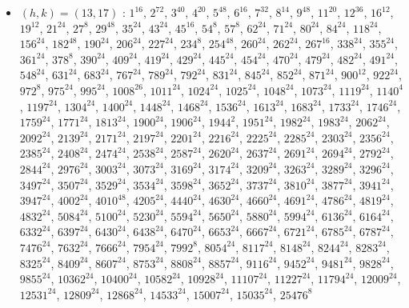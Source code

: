 \begin{itemize}
\item $(h,k)=(13,17)$ : $1^{16}$, $2^{72}$, $3^{40}$, $4^{20}$, $5^{48}$, $6^{16}$, $7^{32}$, $8^{14}$, $9^{48}$, $11^{20}$, $12^{36}$, $16^{12}$, $19^{12}$, $21^{24}$, $27^{8}$, $29^{48}$, $35^{24}$, $43^{24}$, $45^{16}$, $54^{8}$, $57^{8}$, $62^{24}$, $71^{24}$, $80^{24}$, $84^{24}$, $118^{24}$, $156^{24}$, $182^{48}$, $190^{24}$, $206^{24}$, $227^{24}$, $234^{8}$, $254^{48}$, $260^{24}$, $262^{24}$, $267^{16}$, $338^{24}$, $355^{24}$, $361^{24}$, $378^{8}$, $390^{24}$, $409^{24}$, $419^{24}$, $429^{24}$, $445^{24}$, $454^{24}$, $470^{24}$, $479^{24}$, $482^{24}$, $491^{24}$, $548^{24}$, $631^{24}$, $683^{24}$, $767^{24}$, $789^{24}$, $792^{24}$, $831^{24}$, $845^{24}$, $852^{24}$, $871^{24}$, $900^{12}$, $922^{24}$, $972^{8}$, $975^{24}$, $995^{24}$, $1008^{26}$, $1011^{24}$, $1024^{24}$, $1025^{24}$, $1048^{24}$, $1073^{24}$, $1119^{24}$, $1140^{4}$, $1197^{24}$, $1304^{24}$, $1400^{24}$, $1448^{24}$, $1468^{24}$, $1536^{24}$, $1613^{24}$, $1683^{24}$, $1733^{24}$, $1746^{24}$, $1759^{24}$, $1771^{24}$, $1813^{24}$, $1900^{24}$, $1906^{24}$, $1944^{2}$, $1951^{24}$, $1982^{24}$, $1983^{24}$, $2062^{24}$, $2092^{24}$, $2139^{24}$, $2171^{24}$, $2197^{24}$, $2201^{24}$, $2216^{24}$, $2225^{24}$, $2285^{24}$, $2303^{24}$, $2356^{24}$, $2385^{24}$, $2408^{24}$, $2474^{24}$, $2538^{24}$, $2587^{24}$, $2620^{24}$, $2637^{24}$, $2691^{24}$, $2694^{24}$, $2792^{24}$, $2844^{24}$, $2976^{24}$, $3003^{24}$, $3073^{24}$, $3169^{24}$, $3174^{24}$, $3209^{24}$, $3263^{24}$, $3289^{24}$, $3296^{24}$, $3497^{24}$, $3507^{24}$, $3529^{24}$, $3534^{24}$, $3598^{24}$, $3652^{24}$, $3737^{24}$, $3810^{24}$, $3877^{24}$, $3941^{24}$, $3947^{24}$, $4002^{24}$, $4010^{48}$, $4205^{24}$, $4440^{24}$, $4630^{24}$, $4660^{24}$, $4691^{24}$, $4786^{24}$, $4819^{24}$, $4832^{24}$, $5084^{24}$, $5100^{24}$, $5230^{24}$, $5594^{24}$, $5650^{24}$, $5880^{24}$, $5994^{24}$, $6136^{24}$, $6164^{24}$, $6332^{24}$, $6397^{24}$, $6430^{24}$, $6438^{24}$, $6470^{24}$, $6653^{24}$, $6667^{24}$, $6721^{24}$, $6785^{24}$, $6787^{24}$, $7476^{24}$, $7632^{24}$, $7666^{24}$, $7954^{24}$, $7992^{8}$, $8054^{24}$, $8117^{24}$, $8148^{24}$, $8244^{24}$, $8283^{24}$, $8325^{24}$, $8409^{24}$, $8607^{24}$, $8753^{24}$, $8808^{24}$, $8857^{24}$, $9116^{24}$, $9452^{24}$, $9481^{24}$, $9828^{24}$, $9855^{24}$, $10362^{24}$, $10400^{24}$, $10582^{24}$, $10928^{24}$, $11107^{24}$, $11227^{24}$, $11794^{24}$, $12009^{24}$, $12531^{24}$, $12809^{24}$, $12868^{24}$, $14533^{24}$, $15007^{24}$, $15035^{24}$, $25476^{8}$

\end{itemize}
